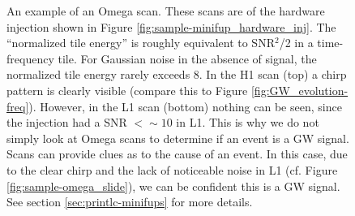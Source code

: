 \begin{figure}[p]
\center
{}
\label{fig:sample-omega_hardware_inj}
\caption{An example of an Omega scan. These scans are of the hardware injection
shown in Figure \ref{fig:sample-minifup_hardware_inj}. The ``normalized tile
energy'' is roughly equivalent to SNR$^2$/2 in a time-frequency tile. For
Gaussian noise in the absence of signal, the normalized tile energy rarely
exceeds 8. In the H1 scan (top) a chirp pattern is clearly visible (compare
this to Figure \ref{fig:GW_evolution-freq}). However, in the L1 scan (bottom)
nothing can be seen, since the injection had a SNR $<\sim10$ in L1. This is
why we do not simply look at Omega scans to determine if an event is a GW
signal. Scans can provide clues as to the cause of an event. In this case, due
to the clear chirp and the lack of noticeable noise in L1 (cf. Figure
\ref{fig:sample-omega_slide}), we can be confident this is a GW signal. See section
\ref{sec:printlc-minifups} for more details.}
\end{figure}

